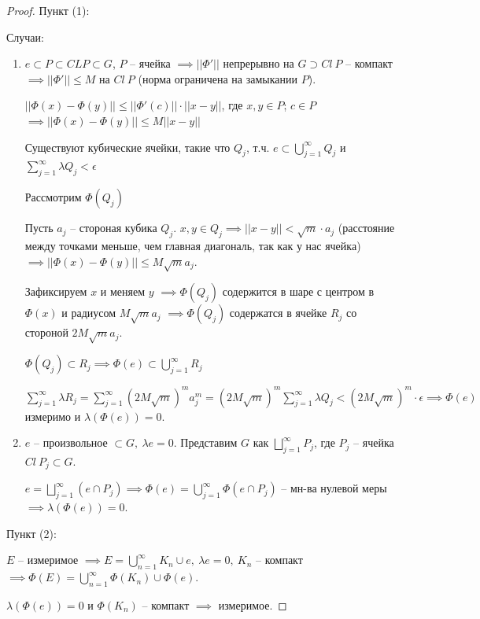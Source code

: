 \begin{proof}
    Пункт (1):

    Случаи:

    \begin{enumerate}
        \item {
            $e \subset P \subset CL P \subset G$, $P$ -- ячейка $ \implies ||\Phi'||$ непрерывно на $G \supset Cl \ P$ -- компакт $\implies ||\Phi'|| \leq M$ на $Cl \ P$ (норма ограничена на замыкании $P$).

            $|| \Phi(x) - \Phi(y) || \leq ||\Phi'(c)|| \cdot || x - y ||$, где $x, y \in P$; $c \in P$ $\implies || \Phi(x) - \Phi(y)|| \leq M || x - y ||$

            Существуют кубические ячейки, такие что $Q_j$, т.ч. $e \subset \bigcup_{j=1}^{\infty}Q_j$ и $\sum_{j=1}^{\infty} \lambda Q_j < \epsilon$

            Рассмотрим $\Phi(Q_j)$ 

            Пусть $a_j$ -- стороная кубика $Q_j$. $ x, y \in Q_j \implies || x - y || < \sqrt{m} \cdot a_j$ (расстояние между точками меньше, чем главная диагональ, так как у нас ячейка) $ \implies || \Phi(x) - \Phi(y) || \leq M \sqrt{m} a_j$.

            Зафиксируем $x$ и меняем $y$ $\implies \Phi(Q_j)$ содержится в шаре с центром в $\Phi(x)$ и радиусом $M \sqrt{m} a_j$ $\implies \Phi(Q_j)$ содержатся в ячейке $R_j$ со стороной $2 M \sqrt{m} a_j$.


            $\Phi(Q_j) \subset R_j \implies \Phi(e) \subset \bigcup_{j=1}^{\infty} R_j$

            $\sum_{j=1}^{\infty} \lambda R_j = \sum_{j=1}^{\infty} (2 M \sqrt{m})^m a_j^m = (2 M \sqrt{m})^m \sum_{j=1}^{\infty} \lambda Q_j < (2 M \sqrt{m})^m \cdot \epsilon \implies \Phi(e)$ измеримо и $\lambda(\Phi (e)) = 0$.
        }
        \item {
            $e$ -- произвольное $\subset G, \ \lambda e = 0$. Представим $G$ как $\bigsqcup_{j=1}^{\infty} P_j$, где $P_j$ -- ячейка $Cl \ P_j \subset G$.

            $e = \bigsqcup_{j=1}^{\infty} (e \cap P_j) \implies \Phi(e) = \bigcup_{j=1}^{\infty} \Phi(e \cap P_j)$ -- мн-ва нулевой меры $\implies \lambda(\Phi(e)) = 0$.
        }
    \end{enumerate}

    Пункт (2):

    $E$ -- измеримое $\implies E = \bigcup_{n=1}^{\infty} K_n \cup e, \ \lambda e = 0, \ K_n$ -- компакт $\implies \Phi(E) = \bigcup_{n=1}^{\infty} \Phi(K_n) \cup \Phi(e)$.

    $\lambda(\Phi(e)) = 0$ и $\Phi(K_n)$ -- компакт $\implies$ измеримое.
\end{proof}

